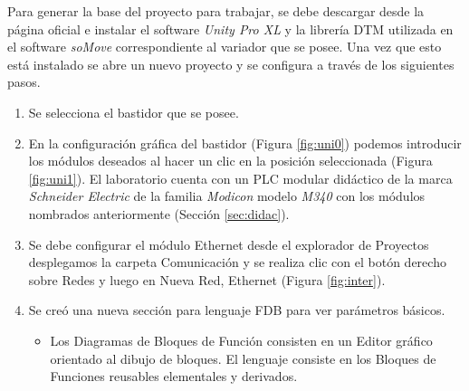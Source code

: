 Para generar la base del proyecto para trabajar, se debe descargar desde la página oficial e instalar el software \textit{Unity Pro XL} y la librería DTM utilizada en el software \textit{soMove} correspondiente al variador que se posee. Una vez que esto está instalado se abre un nuevo proyecto y se configura a través de los siguientes pasos.
\begin{enumerate}
	\item Se selecciona el bastidor que se posee.
	\item En la configuración gráfica del bastidor (Figura \ref{fig:uni0})
	podemos introducir los módulos
	deseados al hacer un clic en la
	posición seleccionada (Figura \ref{fig:uni1}).
	El laboratorio cuenta con un PLC modular didáctico de la marca \textit{Schneider Electric} de la familia \textit{Modicon} modelo \textit{M340} con los módulos nombrados anteriormente (Sección \ref{sec:didac}). 
	\item Se debe configurar el módulo Ethernet desde el explorador de
	Proyectos desplegamos la
	carpeta Comunicación y se realiza clic con el botón derecho sobre Redes y luego en Nueva Red, Ethernet (Figura  \ref{fig:inter}).
	\item Se creó una nueva sección para lenguaje FDB para ver parámetros básicos.
	\begin{itemize}
		\item Los Diagramas de Bloques de Función consisten en un Editor gráfico orientado al dibujo
		de bloques. El lenguaje consiste en los Bloques de Funciones reusables elementales y
		derivados.
	\end{itemize}
\end{enumerate}
	

